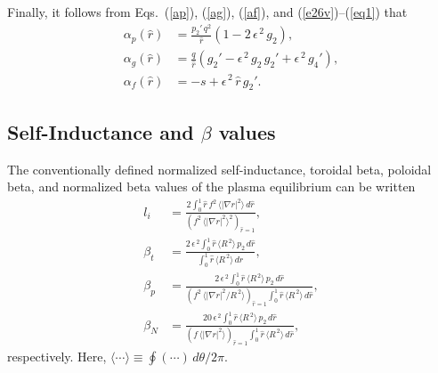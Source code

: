 \documentclass[12pt,prb,aps]{revtex4-1}
\begin{document}
Finally, it follows from Eqs.~(\ref{ap}), (\ref{ag}), (\ref{af}), and (\ref{e26v})--(\ref{eq1}) that
\begin{align}
\alpha_p(\hat{r}) &= \frac{p_2'\,q^2}{\hat{r}}\left(1-2\,\epsilon^{\,2}\,g_2\right),\\[0.5ex]
\alpha_g(\hat{r}) &= \frac{q}{\hat{r}}\left(g_2' -\epsilon^{\,2}\,g_2\,g_2'+\epsilon^{\,2}\,g_4'\right),\\[0.5ex]
\alpha_f(\hat{r}) &= -s + \epsilon^{\,2}\,\hat{r}\,g_2'.
\end{align}

\subsection{Self-Inductance and $\beta$ values}
The conventionally defined normalized self-inductance, toroidal beta, poloidal beta, and normalized beta values of the plasma equilibrium 
can be written\,\cite{gs1}
\begin{align}
l_i&= \frac{2\int_0^1 \hat{r}\,f^2\,\langle |\nabla r|^2\rangle\,d\hat{r}}{(f^2\,\langle|\nabla r|^2\rangle^2)_{\hat{r}=1}},\\[0.5ex]
\beta_t &=  \frac{2\,\epsilon^{\,2}\int_0^1 \hat{r}\,\langle R^{\,2}\rangle\,p_2\,d\hat{r}}{\int_0^1 \hat{r}\,\langle R^{\,2}\rangle\,d\hat{r}},\\[0.5ex]
\beta_p &=  \frac{2\,\epsilon^{\,2}\int_0^1 \hat{r}\,\langle R^{\,2}\rangle\,p_2\,d\hat{r}}
{(f^2\,\langle|\nabla r|^2/R^{\,2}\rangle)_{\hat{r}=1}\int_0^1 \hat{r}\,\langle R^{\,2}\rangle\,d\hat{r}},\\[0.5ex]
\beta_N &=  \frac{20\,\epsilon^{\,2}\int_0^1 \hat{r}\,\langle R^{\,2}\rangle\,p_2\,d\hat{r}}
{(f\,\langle|\nabla r|^2\rangle)_{\hat{r}=1}\int_0^1 \hat{r}\,\langle R^{\,2}\rangle\,d\hat{r}},
\end{align}
respectively. Here, $\langle\cdots\rangle \equiv \oint (\cdots)\,d\theta/2\pi$.
\end{document}
